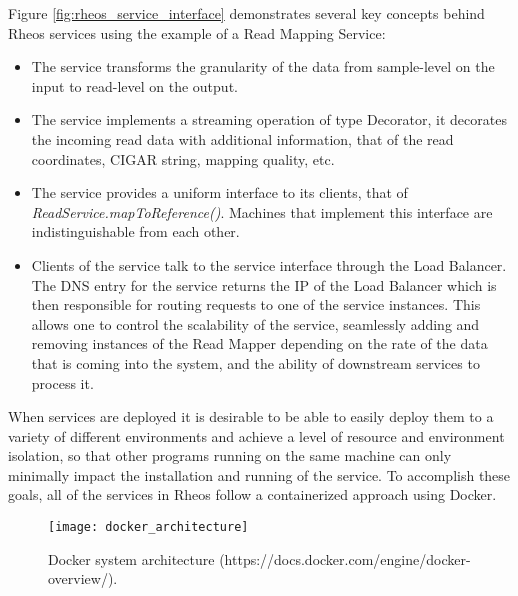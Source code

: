 Figure \ref{fig:rheos_service_interface} demonstrates several key concepts behind Rheos services using the example of a Read Mapping Service:

\begin{itemize}
    \item The service transforms the granularity of the data from sample-level on the input to read-level on the output. 
    \item The service implements a streaming operation of type Decorator, it decorates the incoming read data with additional information, that of the read coordinates, CIGAR string, mapping quality, etc. 
    \item The service provides a uniform interface to its clients, that of \emph{ReadService.mapToReference()}. Machines that implement this interface are indistinguishable from each other. 
    \item Clients of the service talk to the service interface through the Load Balancer. The DNS entry for the service returns the IP of the Load Balancer which is then responsible for routing requests to one of the service instances. This allows one to control the scalability of the service, seamlessly adding and removing instances of the Read Mapper depending on the rate of the data that is coming into the system, and the ability of downstream services to process it.  
\end{itemize}

When services are deployed it is desirable to be able to easily deploy them to a variety of different environments and achieve a level of resource and environment isolation, so that other programs running on the same machine can only minimally impact the installation and running of the service. To accomplish these goals, all of the services in Rheos follow a containerized approach using Docker\autocite{merkel2014docker}.

\begin{figure}[H]
    \texttt{[image: docker\_architecture]}
    \centering
    \caption {Docker system architecture (https://docs.docker.com/engine/docker-overview/).}
    \label{fig:docker_architecture}
\end{figure}

